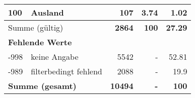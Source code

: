 \begin{longtable}{lXrrr}
     100 &
     \multicolumn{1}{X}{ Ausland   } &


       \num{107} &
       \num[round-mode=places,round-precision=2]{3.74} &
         \num[round-mode=places,round-precision=2]{1.02} \\
     \midrule
     \multicolumn{2}{l}{Summe (gültig)} &
       \textbf{\num{2864}} &
     \textbf{\num{100}} &
       \textbf{\num[round-mode=places,round-precision=2]{27.29}} \\
     \multicolumn{5}{l}{\textbf{Fehlende Werte}}\\
       -998 &
       keine Angabe &
         \num{5542} &
        - &
         \num[round-mode=places,round-precision=2]{52.81} \\
       -989 &
       filterbedingt fehlend &
         \num{2088} &
        - &
         \num[round-mode=places,round-precision=2]{19.9} \\
     \midrule
     \multicolumn{2}{l}{\textbf{Summe (gesamt)}} &
          \textbf{\num{10494}} &
        \textbf{-} &
        \textbf{\num{100}} \\
     \bottomrule
     \end{longtable}
     

